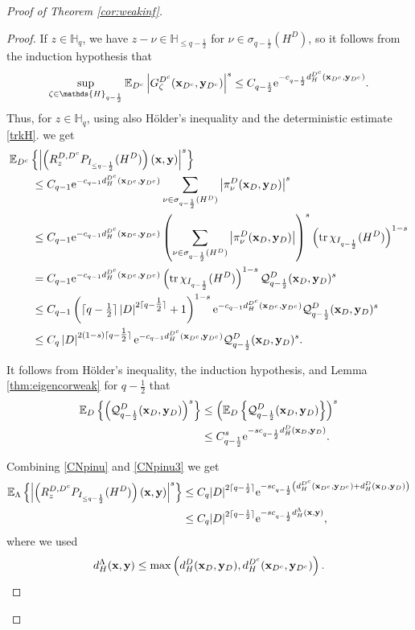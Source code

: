 \documentclass[12pt, a4paper,reqno]{amsart}
\numberwithin{equation}{section}
\DeclareMathOperator{\tr}{tr}
\newcommand\e{\mathrm{e}}
\newcommand\E{\mathbb E}
\newcommand\cQ{\mathcal{Q}}
\newcommand\be{\begin{equation}\begin{aligned}}
\newcommand\ee{\end{aligned}\end{equation}}
\newcommand{\abs}[1]{\left\lvert #1 \right\rvert}
\newcommand{\set}[1]{\left\{ #1 \right\}}
\newcommand{\pa}[1]{\left( #1 \right)}
\newcommand{\cl}[1]{\lceil #1 \rceil}
\newcommand\La{\Lambda}
\newcommand{\eq}[1]{\eqref{#1}}
\begin{document}
\begin{proof}[Proof of  Theorem \ref{cor:weakinf}]
\begin{proof}
If  $z\in\mathds{H}_{q}$, we have  $z-\nu\in \mathds{H}_{\le q-\frac 12}$ for $  {\nu \in \sigma_{q-\frac12}(H^D)}$, so it follows from  the induction hypothesis that
\be
\sup_{\zeta \in\mathds{H}_{q- \frac 12}}\E_{D^c}\abs{G_{\zeta}^{D^c}({\bf x}_{D^c},{\bf y}_{D^c})}^{s}\le  C_{ q-\frac 12}  \e^{-c_{ q- \frac 12} d_H^{D^c} ({\bf x}_{D^c},{\bf y}_{D^c})}.
\ee
Thus, for  $ z\in\mathds{H}_{q}$, using also H\"older's inequality and  the deterministic estimate  \eq{trkH}.  we get
  \be\label{CNpinu}
&\E_{D^c} \set{\abs{\pa{R_z^{D,D^c}P_{I_{\le q-\frac12}}(H^{D})}({\bf x},{\bf y})}^s}\\& \qquad 
\le  C_{ q-1}\e^{-c_{ q-1} d_H^{D^c} ({\bf x}_{D^c},{\bf y}_{D^c})} \sum_{\nu \in \sigma_{q-\frac12}(H^D)}  \abs{ \pi^D_{\nu}({\bf x}_D,{\bf y}_D)}^{s}\\
& \qquad 
\le  C_{ q-1}\e^{-c_{ q-1} d_H^{D^c} ({\bf x}_{D^c},{\bf y}_{D^c})}\pa{ \sum_{\nu \in \sigma_{q-\frac12}(H^D)}  \abs{ \pi^D_{\nu}({\bf x}_D,{\bf y}_D)}}^{s}\pa{\tr \chi_{I_{ q-\frac 12}}(H^D)}^{1-s}\\
& \qquad 
= C_{ q-1}\e^{-c_{ q-1} d_H^{D^c} ({\bf x}_{D^c},{\bf y}_{D^c})}\pa{\tr \chi_{I_{ q-\frac 12}}(H^D)}^{1-s}\cQ^D_{q-\frac12}({\bf x}_D,{\bf y}_D)^s \\
& \qquad 
\le C_{ q-1}\pa{{ \cl{q-\tfrac 12} \abs{D}^{2\cl{q-\tfrac 12}} +1}}^{1-s}\e^{-c_{ q-1} d_H^{D^c} ({\bf x}_{D^c},{\bf y}_{D^c})}\cQ^D_{q-\frac12}({\bf x}_D,{\bf y}_D)^s \\
& \qquad 
\le C_{ q} \abs{D}^{2(1-s)\cl{q-\tfrac 12}} \e^{-c_{ q-1} d_H^{D^c} ({\bf x}_{D^c},{\bf y}_{D^c})}\cQ^D_{q-\frac12}({\bf x}_D,{\bf y}_D)^s .
\ee



It follows from H\"older's inequality, the induction hypothesis, and  Lemma \ref{thm:eigencorweak} for $q-\frac 12$
that
\be\label{CNpinu3}
\E_D \set{\pa{ \cQ^D_{q-\frac12}({\bf x}_D,{\bf y}_D)}^s}&
\le\pa{  \E_D \set{ \cQ^D_{q-\frac12}({\bf x}_D,{\bf y}_D)}}^s
\\   &  \le C_{q-\frac12}^s   \e^{-sc_{q-\frac12}d_H^D ({\bf x}_D,{\bf y}_D)}.
\ee



Combining  \eq{CNpinu} and \eq{CNpinu3} we get
\be\label{CNpinu98}
\E_{\La} \set{\abs{\pa{R_z^{D,D^c}P_{I_{\le q-\frac12}}(H^{D})}({\bf x},{\bf y})}^s}&\le   C_{ q}{\abs{D}}^{2\cl{q-\frac12}}\e^{-s c_{q-\frac12} \pa{ d_H^{D^c} ({\bf x}_{D^c},{\bf y}_{D^c})+d_H^D ({\bf x}_D,{\bf y}_D)} }\\
& \le    C_{ q}{\abs{D}}^{2\cl{q-\frac12}} \e^{-sc_{q-\frac12} { d_H^\La ({\bf x},{\bf y})} },
\ee
where we used 
\be
d_H^\La ({\bf x},{\bf y}) \le \max \pa{d_H^D ({\bf x}_D,{\bf y}_D),d_H^{D^c} ({\bf x}_{D^c},{\bf y}_{D^c})}.
\ee



\end{proof}
\end{proof}
\end{document}
